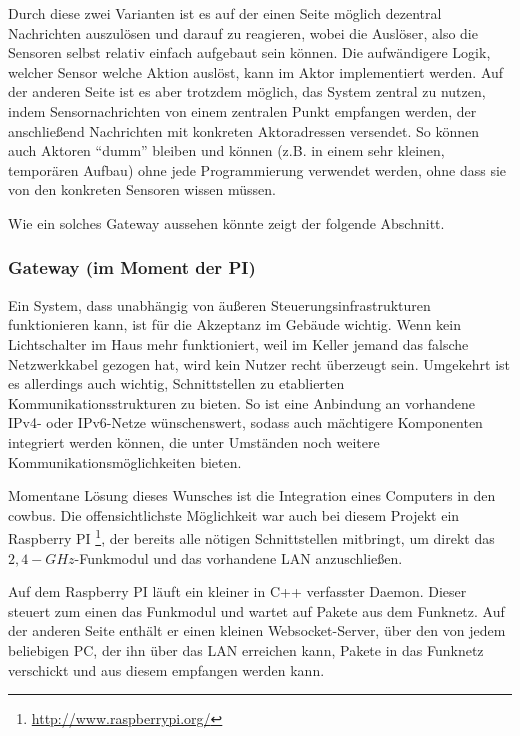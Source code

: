 \documentclass{IEEEtran}
\begin{document}
            Durch diese zwei Varianten ist es auf der einen Seite möglich
            dezentral Nachrichten auszulösen und darauf zu reagieren, wobei
            die Auslöser, also die Sensoren selbst relativ einfach aufgebaut
            sein können. Die aufwändigere Logik, welcher Sensor welche Aktion
            auslöst, kann im Aktor implementiert werden.
            Auf der anderen Seite ist es aber trotzdem möglich, das System
            zentral zu nutzen, indem Sensornachrichten von einem zentralen
            Punkt empfangen werden, der anschließend Nachrichten mit konkreten
            Aktoradressen versendet. So können auch Aktoren \enquote{dumm}
            bleiben und können (z.B. in einem sehr kleinen, temporären Aufbau)
            ohne jede Programmierung verwendet werden, ohne dass sie von den
            konkreten Sensoren wissen müssen.

            Wie ein solches Gateway aussehen könnte zeigt der folgende Abschnitt.

        \subsubsection{Gateway (im Moment der PI)}
            Ein System, dass unabhängig von äußeren Steuerungsinfrastrukturen
            funktionieren kann, ist für die Akzeptanz im Gebäude wichtig.
            Wenn kein Lichtschalter im Haus mehr funktioniert, weil
            im Keller jemand das falsche Netzwerkkabel gezogen hat,
            wird kein Nutzer recht überzeugt sein.
            Umgekehrt ist es allerdings auch wichtig, Schnittstellen zu
            etablierten Kommunikationsstrukturen zu bieten.
            So ist eine Anbindung an vorhandene IPv4- oder IPv6-Netze
            wünschenswert, sodass auch mächtigere Komponenten integriert werden
            können, die unter Umständen noch weitere Kommunikationsmöglichkeiten
            bieten.

            Momentane Lösung dieses Wunsches ist die Integration eines Computers
            in den cowbus. Die offensichtlichste Möglichkeit war auch bei diesem
            Projekt ein Raspberry PI \footnote{\url{http://www.raspberrypi.org/}},
            der bereits alle nötigen Schnittstellen mitbringt, um direkt das
            $2,4-GHz$-Funkmodul und das vorhandene \ac{LAN} anzuschließen.

            Auf dem Raspberry PI läuft ein kleiner in C++ verfasster Daemon.
            Dieser steuert zum einen das Funkmodul und wartet auf Pakete aus
            dem Funknetz.
            Auf der anderen Seite enthält er einen kleinen Websocket-Server,
            über den von jedem beliebigen PC, der ihn über das \ac{LAN}
            erreichen kann, Pakete in das Funknetz verschickt und aus diesem
            empfangen werden kann.
\end{document}
